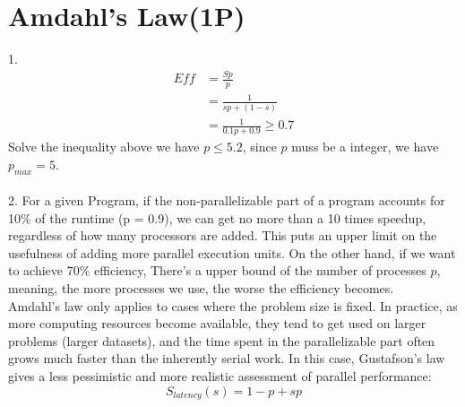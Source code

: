 \documentclass[article]{scrartcl}
\begin{document}
\maketitle
\thispagestyle{fancy}

%
%

\section{Amdahl's Law(1P)}
1. 
\begin{align*}
  Eff &= \frac{Sp}{p} \\
      &= \frac{1}{sp + (1-s)} \\
      &= \frac{1}{0.1p + 0.9} \geq 0.7
\end{align*}
Solve the inequality above we have $p \leq 5.2$, since $p$ muss be a integer, we have $p_{max} = 5$.
\\
\\
2.
For a given Program, if the non-parallelizable part of a program accounts for 10\% of the runtime (p = 0.9), we can get no more than a 10 times speedup, regardless of how many processors are added. This puts an upper limit on the usefulness of adding more parallel execution units. 
On the other hand, if we want to achieve 70\% efficiency,
There's a upper bound of the number of processes $p$, meaning, the more processes we use, the worse the efficiency becomes.
\\
Amdahl's law only applies to cases where the problem size is fixed. In practice, as more computing resources become available, 
they tend to get used on larger problems (larger datasets), and the time spent in the parallelizable part often grows much faster than the inherently serial work.
In this case, Gustafson's law gives a less pessimistic and more realistic assessment of parallel performance\cite{Gustafson}:
$$
S_{latency}(s)=1-p+sp
$$
\end{document}
